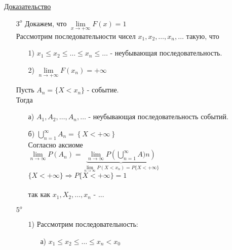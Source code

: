 \underline{Доказательство}
\begin{enumerate}
	\item[$3^o$]
	Докажем, что $\lim\limits_{x \to +\infty} F(x) = 1$ \\
	Рассмотрим последовательности чисел $x_1, x_2, \ldots , x_n , \ldots$ такую, что
	\begin{enumerate}
		\item[1)] 
		$x_1 \leqslant x_2 \leqslant \ldots \leqslant x_n \leqslant \ldots$ - неубывающая последовательность.
			
		\item[2)]
		$\lim\limits_{n \to +\infty} F(x_n) = +\infty$
	\end{enumerate}
	Пусть $A_n = \{X < x_n\}$ - событие. \\
	Тогда
	\begin{enumerate}
		\item[а)]
		$A_1, A_2, \ldots , A_n, \ldots$ - неубывающая последовательность событий. \\
		
		\item[б)]
		$\bigcup\limits_{n = 1}^{\infty} A_n = \left\{X < +\infty \right\}$ \\
		Согласно аксиоме \\
		$\lim\limits_{n \to \infty} P(A_n) = \underbrace{\lim\limits_{n \to \infty} P\left(\bigcup\limits_{n = 1}^{\infty} A)n \right)}_{\lim\limits_{n \to \infty} P(X < x_n) = P\{X < +\infty\}}$ \\
		$\{X < +\infty\} \Rightarrow P\{X < +\infty\} = 1$ \\
		 \\
		так как $x_1, X_2, \ldots, x_n$ - ...
	\end{enumerate}
	
	\item[$5^o$]
	\begin{enumerate}
		\item[1)]
		Рассмотрим последовательность: \\
		\begin{enumerate}
			\item[а)]
			$x_1 \leqslant x_2 \leqslant \ldots \leqslant x_n < x_0$ \\
			

\end{enumerate}
\end{enumerate}
\end{enumerate}
